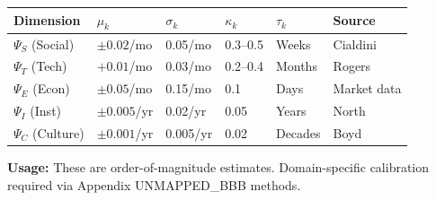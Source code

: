 \documentclass[11pt, a4paper]{article}
\begin{document}
\begin{tcolorbox}[colback=gray!5!white, colframe=gray!75!black,
    title=\textbf{Parameter Table: Context Drift by Dimension}]

\begin{center}
\renewcommand{\arraystretch}{1.3}
\begin{tabular}{@{}llllll@{}}
\toprule
\textbf{Dimension} & \textbf{$\mu_k$} & \textbf{$\sigma_k$} & \textbf{$\kappa_k$} & \textbf{$\tau_k$} & \textbf{Source} \\
\midrule
$\Psi_S$ (Social) & $\pm 0.02$/mo & 0.05/mo & 0.3--0.5 & Weeks & Cialdini \\
$\Psi_T$ (Tech) & $+0.01$/mo & 0.03/mo & 0.2--0.4 & Months & Rogers \\
$\Psi_E$ (Econ) & $\pm 0.05$/mo & 0.15/mo & 0.1 & Days & Market data \\
$\Psi_I$ (Inst) & $\pm 0.005$/yr & 0.02/yr & 0.05 & Years & North \\
$\Psi_C$ (Culture) & $\pm 0.001$/yr & 0.005/yr & 0.02 & Decades & Boyd \\
\bottomrule
\end{tabular}
\end{center}

\textbf{Usage:} These are order-of-magnitude estimates. Domain-specific calibration required via Appendix UNMAPPED_BBB methods.

\end{tcolorbox}
\end{document}
